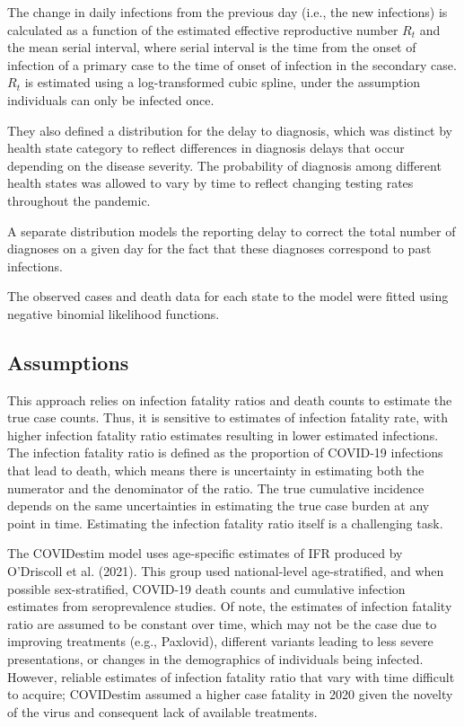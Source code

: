 \documentclass[12pt,twoside]{smiththesis}
\begin{document}
The change in daily infections from the previous day (i.e., the new infections) is calculated as a function of the estimated effective reproductive number \(R_t\) and the mean serial interval, where serial interval is the time from the onset of infection of a primary case to the time of onset of infection in the secondary case. \(R_t\) is estimated using a log-transformed cubic spline, under the assumption individuals can only be infected once.

They also defined a distribution for the delay to diagnosis, which was distinct by health state category to reflect differences in diagnosis delays that occur depending on the disease severity.
The probability of diagnosis among different health states was allowed to vary by time to reflect changing testing rates throughout the pandemic.

A separate distribution models the reporting delay to correct the total number of diagnoses on a given day for the fact that these diagnoses correspond to past infections.

The observed cases and death data for each state to the model were fitted using negative binomial likelihood functions.

\hypertarget{assumptions}{%
\subsection{Assumptions}\label{assumptions}}

This approach relies on infection fatality ratios and death counts to estimate the true case counts. Thus, it is sensitive to estimates of infection fatality rate, with higher infection fatality ratio estimates resulting in lower estimated infections. The infection fatality ratio is defined as the proportion of COVID-19 infections that lead to death, which means there is uncertainty in estimating both the numerator and the denominator of the ratio. The true cumulative incidence depends on the same uncertainties in estimating the true case burden at any point in time. Estimating the infection fatality ratio itself is a challenging task.

The COVIDestim model uses age-specific estimates of IFR produced by O'Driscoll et al. (2021). This group used national-level age-stratified, and when possible sex-stratified, COVID-19 death counts and cumulative infection estimates from seroprevalence studies. Of note, the estimates of infection fatality ratio are assumed to be constant over time, which may not be the case due to improving treatments (e.g., Paxlovid), different variants leading to less severe presentations, or changes in the demographics of individuals being infected. However, reliable estimates of infection fatality ratio that vary with time difficult to acquire; COVIDestim assumed a higher case fatality in 2020 given the novelty of the virus and consequent lack of available treatments.
\end{document}
